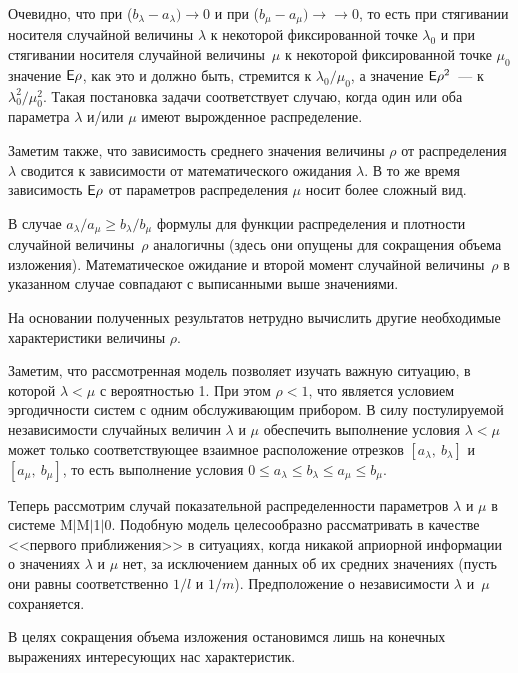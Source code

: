 \begin{multicols}{2}
Очевидно, что при ($b_\lambda-a_\lambda)\rightarrow0$ и при ($b_\mu-a_\mu)\rightarrow$\linebreak $\rightarrow 0$, то есть при стягивании носителя
случайной величины $\lambda$ к некоторой фиксированной точке $\lambda_0$ и при стягивании носителя случайной 
величины~$\mu$ к некоторой фиксированной точке $\mu_0$ значение ${\sf E}\rho$, как это и должно быть, стремится к $\lambda_0/\mu_0$,
а значение ${\sf E}\rho^2$~--- к $\lambda_0^2/\mu_0^2$. Такая постановка задачи соответствует случаю, когда один или оба
параметра $\lambda$ и/или $\mu$ имеют вырожденное распределение.

Заметим также, что зависимость среднего значения величины $\rho$ от распределения $\lambda$ сводится к зависимости от
математического ожидания $\lambda$. В то же время зависимость ${\sf E}\rho$ от параметров распределения $\mu$ носит более
сложный вид.

В случае $a_\lambda/a_\mu\ge b_\lambda/b_\mu$ формулы для функции распределения и плотности случайной величины~$\rho$
аналогичны (здесь они опущены для сокращения объема изложения). Математическое ожидание и второй момент случайной
величины~$\rho$ в указанном случае совпадают с выписанными выше зна\-че\-ниями.

На основании полученных результатов нетрудно вычислить другие необходимые характеристики величины $\rho$.

Заметим, что рассмотренная модель позволяет изучать важную ситуацию, в которой $\lambda<\mu$ с вероятностью 1. При этом
$\rho<1$, что является условием эргодичности систем с одним обслуживающим прибором. В силу постулируемой независимости
случайных величин $\lambda$ и $\mu$ обеспечить выполнение условия $\lambda<\mu$ может только соответствующее взаимное
расположение отрезков $[a_\lambda,\ b_\lambda]$ и $[a_\mu,\ b_\mu]$, то есть выполнение условия $0\le a_\lambda\le
b_\lambda\le a_\mu\le b_\mu$.

Теперь рассмотрим случай показательной распределенности параметров $\lambda$ и $\mu$ в системе M$\vert$M$\vert$1$\vert$0. Подобную модель
целесообразно рассматривать в качестве <<первого приближения>> в ситуациях, когда никакой априорной информации о
значениях $\lambda$ и $\mu$ нет, за исключением данных об их средних значениях (пусть они равны соответственно $1/l$ и
$1/m$). Предположение о независимости $\lambda$ и~$\mu$ сохраняется.

В целях сокращения объема изложения остановимся лишь на конечных выражениях ин\-те\-ре\-су\-ющих нас характеристик.


\end{multicols}

